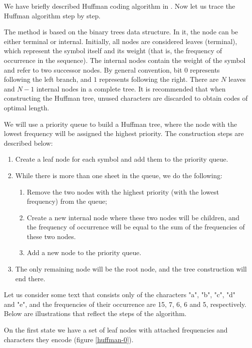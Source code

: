 We have briefly described Huffman coding algorithm in . Now let us trace the Huffman algorithm step by step.

The method is based on the binary trees data structure. In it, the node can be either terminal or internal. Initially, all nodes are considered leaves (terminal), which represent the symbol itself and its weight (that is, the frequency of occurrence in the sequence). The internal nodes contain the weight of the symbol and refer to two successor nodes. By general convention, bit $0$ represents following the left branch, and $1$ represents following the right. There are $N$ leaves and $N-1$ internal nodes in a complete tree. It is recommended that when constructing the Huffman tree, unused characters are discarded to obtain codes of optimal length.

We will use a priority queue to build a Huffman tree, where the node with the lowest frequency will be assigned the highest priority. The construction steps are described below:

\begin{enumerate}
    \item Create a leaf node for each symbol and add them to the priority queue.
    \item While there is more than one sheet in the queue, we do the following:
          \begin{enumerate}
              \item Remove the two nodes with the highest priority (with the lowest frequency) from the queue;
              \item Create a new internal node where these two nodes will be children, and the frequency of occurrence will be equal to the sum of the frequencies of these two nodes.
              \item Add a new node to the priority queue.
          \end{enumerate}
    \item The only remaining node will be the root node, and the tree construction will end there.
\end{enumerate}

Let us consider some text that consists only of the characters "a", "b", "c", "d" and "e", and the frequencies of their occurrence are 15, 7, 6, 6 and 5, respectively. Below are illustrations that reflect the steps of the algorithm.

On the first state we have a set of leaf nodes with attached frequencies and characters they encode (figure \ref{huffman-0}).

